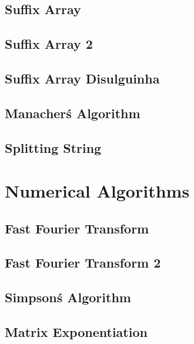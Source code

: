 \subsection{Suffix Array}
\raggedbottom
\hrulefill
\subsection{Suffix Array 2}
\raggedbottom
\hrulefill
\subsection{Suffix Array Disulguinha}
\raggedbottom
\hrulefill
\subsection{Manacher\'s Algorithm}
\raggedbottom
\hrulefill
\subsection{Splitting String}
\raggedbottom
\hrulefill

\section{Numerical Algorithms}
\subsection{Fast Fourier Transform}
\raggedbottom
\hrulefill
\subsection{Fast Fourier Transform 2}
\raggedbottom
\hrulefill
\subsection{Simpson\'s Algorithm}
\raggedbottom
\hrulefill
\subsection{Matrix Exponentiation}
\raggedbottom
\hrulefill

